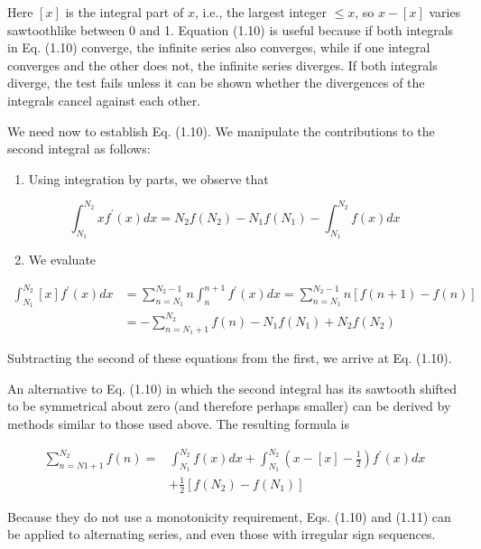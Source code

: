 \documentclass[10pt]{article}
\begin{document}
Here $[x]$ is the integral part of $x$, i.e., the largest integer $\leq x$, so $x-[x]$ varies sawtoothlike between 0 and 1. Equation (1.10) is useful because if both integrals in Eq. (1.10) converge, the infinite series also converges, while if one integral converges and the other does not, the infinite series diverges. If both integrals diverge, the test fails unless it can be shown whether the divergences of the integrals cancel against each other.

We need now to establish Eq. (1.10). We manipulate the contributions to the second integral as follows:

\begin{enumerate}
  \item Using integration by parts, we observe that
\end{enumerate}

$$
\int_{N_{1}}^{N_{2}} x f^{\prime}(x) d x=N_{2} f\left(N_{2}\right)-N_{1} f\left(N_{1}\right)-\int_{N_{1}}^{N_{2}} f(x) d x
$$

\begin{enumerate}
  \setcounter{enumi}{1}
  \item We evaluate
\end{enumerate}

$$
\begin{aligned}
\int_{N_{1}}^{N_{2}}[x] f^{\prime}(x) d x & =\sum_{n=N_{1}}^{N_{2}-1} n \int_{n}^{n+1} f^{\prime}(x) d x=\sum_{n=N_{1}}^{N_{2}-1} n[f(n+1)-f(n)] \\
& =-\sum_{n=N_{1}+1}^{N_{2}} f(n)-N_{1} f\left(N_{1}\right)+N_{2} f\left(N_{2}\right)
\end{aligned}
$$

Subtracting the second of these equations from the first, we arrive at Eq. (1.10).

An alternative to Eq. (1.10) in which the second integral has its sawtooth shifted to be symmetrical about zero (and therefore perhaps smaller) can be derived by methods similar to those used above. The resulting formula is


\begin{align*}
\sum_{n=N 1+1}^{N_{2}} f(n)= & \int_{N_{1}}^{N_{2}} f(x) d x+\int_{N_{1}}^{N_{2}}\left(x-[x]-\frac{1}{2}\right) f^{\prime}(x) d x  \tag{1.11}\\
& +\frac{1}{2}\left[f\left(N_{2}\right)-f\left(N_{1}\right)\right]
\end{align*}


Because they do not use a monotonicity requirement, Eqs. (1.10) and (1.11) can be applied to alternating series, and even those with irregular sign sequences.
\end{document}
